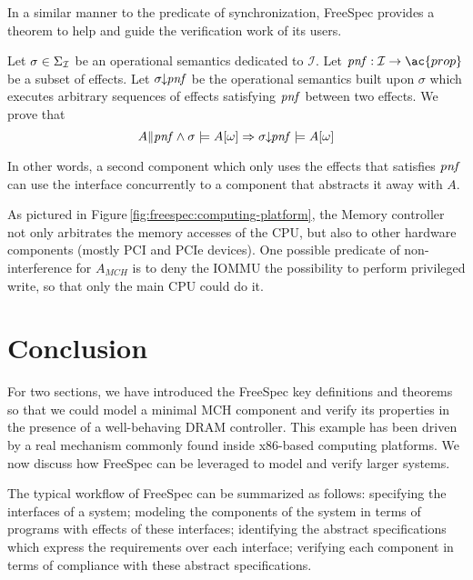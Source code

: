 In a similar manner to the predicate of synchronization, FreeSpec provides a
theorem to help and guide the verification work of its users.

\begin{theorem}
  Let $\sigma \in \Sigma_{\mathcal{I}}$ be an operational semantics dedicated to
  $\mathcal{I}$. Let $\func{pnf} : \I \rightarrow \ac{prop}$ be a subset of
  effects. Let $\sigma\!\!\downarrow\!\!\mathit{pnf}$ be the operational semantics
  built upon $\sigma$ which executes arbitrary sequences of effects satisfying
  $\mathit{pnf}$ between two effects.  We prove that
  \[ A \| \mathit{pnf} \wedge \sigma \models A[\omega] \Rightarrow
    \sigma\!\!\downarrow\!\!\mathit{pnf} \models A[\omega]
  \]
\end{theorem}

In other words, a second component which only uses the effects that satisfies
$\mathit{pnf}$ can use the interface concurrently to a component that abstracts it
away with $A$.

\begin{example}
  As pictured in Figure\,\ref{fig:freespec:computing-platform}, the Memory
  controller not only arbitrates the memory accesses of the CPU, but also to
  other hardware components (mostly PCI and PCIe devices).
  One possible predicate of non-interference for $A_{MCH}$ is to deny the IOMMU
  the possibility to perform privileged write, so that only the main CPU could
  do it.
\end{example}

\section{Conclusion}
\label{sec:freespec:scale}

For two sections, we have introduced the FreeSpec key definitions and theorems
so that we could model a minimal MCH component and verify its properties in the
presence of a well-behaving DRAM controller.
%
This example has been driven by a real mechanism commonly found inside x86-based
computing platforms.
%
We now discuss how FreeSpec can be leveraged to model and verify larger systems.

The typical workflow of FreeSpec can be summarized as follows: specifying the
interfaces of a system; modeling the components of the system in terms of
programs with effects of these interfaces; identifying the abstract
specifications which express the requirements over each interface; verifying
each component in terms of compliance with these abstract specifications.

